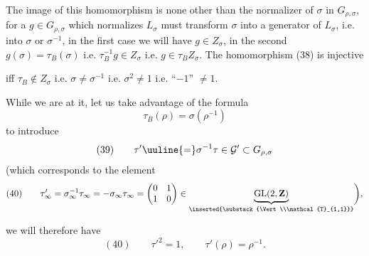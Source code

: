 The image of this homomorphism is none other than the normalizer of $\sigma$
in $G_{\rho,\sigma}$, for a 
$g\in G_{\rho,\sigma}$ which normalizes $L_\sigma$ must transform
$\sigma$ into a generator of $L_\sigma$, i.e. into $\sigma$ or
$\sigma^{-1}$, in the first case we will have $g\in Z_\sigma$, in
the second $g(\sigma)=\tau_B(\sigma)$ i.e. $\tau_B^{-1}g\in Z_\sigma$
i.e. $g\in\tau_B Z_\sigma$. The homomorphism (38) is injective



iff $\tau_B\notin Z_\sigma$ i.e. $\sigma\ne\sigma^{-1}$ i.e.
$\sigma^2\ne1$ i.e. ``$-1$'' $\ne1$.

While we are at it, let us take advantage of the formula
\[
\tau_B(\rho)=\sigma(\rho^{-1})
\]
to introduce
\[
(39)\qquad
\tau'\uuline{=}\sigma^{-1}\tau\in\mathcal{G}'\subset G_{\rho,\sigma}
\]
(which corresponds to the element
\[
(40)\qquad
\tau'_\infty=\sigma_\infty^{-1}\tau_\infty
=-\sigma_\infty\tau_\infty
=\begin{pmatrix}0&1\\1&0\end{pmatrix}
\in\underbrace{\mathrm{GL}(2,\mathbf{Z})}_{
\inserted{\substack{\Vert\\\mathcal{T}_{1,1}}}}
\biggr),
\]

 we will therefore have
\[
(40)\qquad \tau'^2=1,\qquad \tau'(\rho)=\rho^{-1}.
\]

